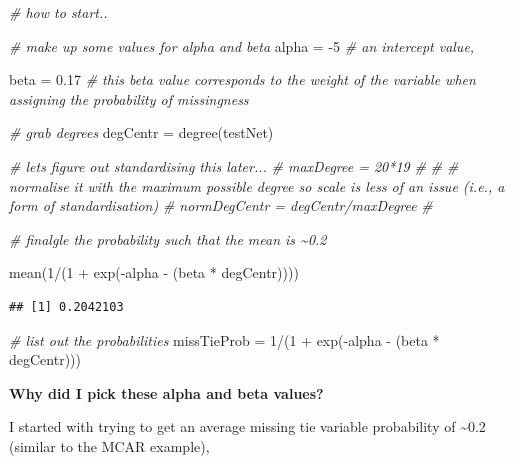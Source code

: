 \documentclass[
]{article}
\newenvironment{Shaded}{\begin{snugshade}}{\end{snugshade}}
\newcommand{\CommentTok}[1]{\textcolor[rgb]{0.56,0.35,0.01}{\textit{#1}}}
\newcommand{\DecValTok}[1]{\textcolor[rgb]{0.00,0.00,0.81}{#1}}
\newcommand{\FloatTok}[1]{\textcolor[rgb]{0.00,0.00,0.81}{#1}}
\newcommand{\FunctionTok}[1]{\textcolor[rgb]{0.00,0.00,0.00}{#1}}
\newcommand{\NormalTok}[1]{#1}
\newcommand{\OtherTok}[1]{\textcolor[rgb]{0.56,0.35,0.01}{#1}}
\newcommand{\SpecialCharTok}[1]{\textcolor[rgb]{0.00,0.00,0.00}{#1}}
\begin{document}
\begin{Shaded}
\begin{Highlighting}[]
\CommentTok{\# how to start..}

\CommentTok{\# make up some values for alpha and beta}
\NormalTok{alpha }\OtherTok{=} \SpecialCharTok{{-}}\DecValTok{5}  \CommentTok{\# an intercept value,}

\NormalTok{beta }\OtherTok{=} \FloatTok{0.17} \CommentTok{\# this beta value corresponds to the weight of the variable when assigning the probability of missingness}

\CommentTok{\# grab degrees}
\NormalTok{degCentr }\OtherTok{=} \FunctionTok{degree}\NormalTok{(testNet)}

\CommentTok{\# let\textquotesingle{}s figure out standardising this later...}
\CommentTok{\# maxDegree = 20*19}
\CommentTok{\# }
\CommentTok{\# \# normalise it with the maximum possible degree so scale is less of an issue (i.e., a form of standardisation)}
\CommentTok{\# normDegCentr = degCentr/maxDegree}
\CommentTok{\# }

\CommentTok{\# finalgle the probability such that the mean is \textasciitilde{}0.2}

\FunctionTok{mean}\NormalTok{(}\DecValTok{1}\SpecialCharTok{/}\NormalTok{(}\DecValTok{1} \SpecialCharTok{+} \FunctionTok{exp}\NormalTok{(}\SpecialCharTok{{-}}\NormalTok{alpha }\SpecialCharTok{{-}}\NormalTok{ (beta }\SpecialCharTok{*}\NormalTok{ degCentr))))}
\end{Highlighting}
\end{Shaded}

\begin{verbatim}
## [1] 0.2042103
\end{verbatim}

\begin{Shaded}
\begin{Highlighting}[]
\CommentTok{\# list out the probabilities}
\NormalTok{missTieProb }\OtherTok{=} \DecValTok{1}\SpecialCharTok{/}\NormalTok{(}\DecValTok{1} \SpecialCharTok{+} \FunctionTok{exp}\NormalTok{(}\SpecialCharTok{{-}}\NormalTok{alpha }\SpecialCharTok{{-}}\NormalTok{ (beta }\SpecialCharTok{*}\NormalTok{ degCentr)))}
\end{Highlighting}
\end{Shaded}

\textbf{Why did I pick these alpha and beta values?}

I started with trying to get an average missing tie variable probability
of \textasciitilde0.2 (similar to the MCAR example),
\end{document}
